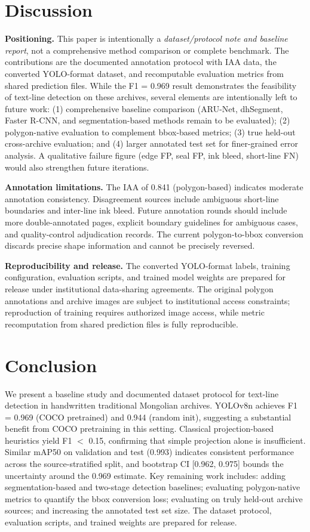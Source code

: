 \documentclass[pdflatex,sn-mathphys-num]{sn-jnl}
\begin{document}
\section{Discussion}
\textbf{Positioning.} This paper is intentionally a \emph{dataset/protocol note and baseline report}, not a comprehensive method comparison or complete benchmark. The contributions are the documented annotation protocol with IAA data, the converted YOLO-format dataset, and recomputable evaluation metrics from shared prediction files. While the F1 = 0.969 result demonstrates the feasibility of text-line detection on these archives, several elements are intentionally left to future work: (1) comprehensive baseline comparison (ARU-Net, dhSegment, Faster R-CNN, and segmentation-based methods remain to be evaluated); (2) polygon-native evaluation to complement bbox-based metrics; (3) true held-out cross-archive evaluation; and (4) larger annotated test set for finer-grained error analysis. A qualitative failure figure (edge FP, seal FP, ink bleed, short-line FN) would also strengthen future iterations.

\textbf{Annotation limitations.} The IAA of 0.841 (polygon-based) indicates moderate annotation consistency. Disagreement sources include ambiguous short-line boundaries and inter-line ink bleed. Future annotation rounds should include more double-annotated pages, explicit boundary guidelines for ambiguous cases, and quality-control adjudication records. The current polygon-to-bbox conversion discards precise shape information and cannot be precisely reversed.

\textbf{Reproducibility and release.} The converted YOLO-format labels, training configuration, evaluation scripts, and trained model weights are prepared for release under institutional data-sharing agreements. The original polygon annotations and archive images are subject to institutional access constraints; reproduction of training requires authorized image access, while metric recomputation from shared prediction files is fully reproducible.

\section{Conclusion}
We present a baseline study and documented dataset protocol for text-line detection in handwritten traditional Mongolian archives. YOLOv8n achieves F1 = 0.969 (COCO pretrained) and 0.944 (random init), suggesting a substantial benefit from COCO pretraining in this setting. Classical projection-based heuristics yield F1 $<$ 0.15, confirming that simple projection alone is insufficient. Similar mAP50 on validation and test (0.993) indicates consistent performance across the source-stratified split, and bootstrap CI [0.962, 0.975] bounds the uncertainty around the 0.969 estimate. Key remaining work includes: adding segmentation-based and two-stage detection baselines; evaluating polygon-native metrics to quantify the bbox conversion loss; evaluating on truly held-out archive sources; and increasing the annotated test set size. The dataset protocol, evaluation scripts, and trained weights are prepared for release.
\end{document}

